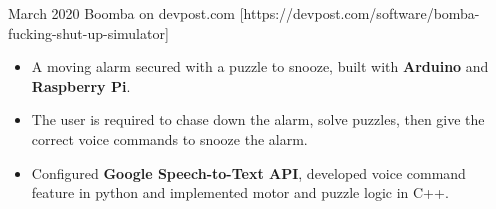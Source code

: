 \documentclass[10pt,a4paper,ragged2e,withhyper]{altacv}
\begin{document}
\begin{paracol}{2}
\divider{}

{March 2020 
  \printinfo{\faGlobe}
  {Boomba on devpost.com}
  [https://devpost.com/software/bomba-fucking-shut-up-simulator]
}{} 
\begin{itemize}
  \item A moving alarm secured with a puzzle to snooze, built with \textbf{Arduino} and \textbf{Raspberry Pi}.
  \item The user is required to chase down the alarm, solve puzzles, then give the correct voice commands to snooze the alarm.
    
  \item Configured \textbf{Google Speech-to-Text API}, developed voice command feature in python and implemented motor and puzzle logic in C++.
\end{itemize}
\\








    

\end{paracol}
\end{document}
